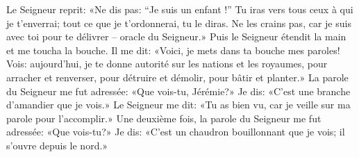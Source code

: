 Le Seigneur reprit: «Ne dis pas: “Je suis un enfant !”
	Tu iras vers tous ceux à qui je t’enverrai;
	tout ce que je t’ordonnerai, tu le diras.
Ne les crains pas, car je suis avec toi pour te délivrer – oracle du Seigneur.»
Puis le Seigneur étendit la main et me toucha la bouche.
Il me dit:
	«Voici, je mets dans ta bouche mes paroles!
	Vois: aujourd’hui, je te donne autorité sur les nations et les royaumes,
	pour arracher et renverser, pour détruire et démolir,
		pour bâtir et planter.»
La parole du Seigneur me fut adressée:
	«Que vois-tu, Jérémie?»
	Je dis: «C’est une branche d’amandier que je vois.»
Le Seigneur me dit:
	«Tu as bien vu, car je veille sur ma parole pour l’accomplir.»
Une deuxième fois, la parole du Seigneur me fut adressée:
	«Que vois-tu?»
	Je dis: «C’est un chaudron bouillonnant que je vois;
	il s’ouvre depuis le nord.»
